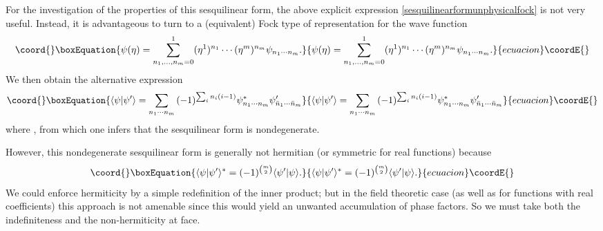 \documentclass[a4paper,10pt]{article}
\begin{document}
For the investigation of the properties of this sesquilinear form, the above explicit 
expression \eqref{sesquilinearformunphysicalfock} is not very useful. Instead, it is 
advantageous to turn to a (equivalent) Fock type of representation for the wave function
\begin{equation}\coord{}\boxEquation{\label{schroedingerwavefunctionrealfermionsfock}
\psi(\eta)=\sum_{n_1,\ldots,n_m=0}^{1}(\eta^1)^{n_1}\cdots
(\eta^m)^{n_m}\psi_{n_1\cdots n_m}.
}{\psi(\eta)=\sum_{n_1,\ldots,n_m=0}^{1}(\eta^1)^{n_1}\cdots
(\eta^m)^{n_m}\psi_{n_1\cdots n_m}.
}{ecuacion}\coordE{}\end{equation}
We then obtain the alternative expression
\begin{equation}\coord{}\boxEquation{\label{innerproductfockrepresentationunphysical}
\langle\psi|\psi^{\prime}\rangle=\sum_{n_1\cdots n_m}\,(-1)^{\sum_{i}n_i(i-1)}
\psi_{n_1\cdots n_m}^{\ast}\psi^{\prime}_{\bar{n}_1\cdots\bar{n}_m}
}{\langle\psi|\psi^{\prime}\rangle=\sum_{n_1\cdots n_m}\,(-1)^{\sum_{i}n_i(i-1)}
\psi_{n_1\cdots n_m}^{\ast}\psi^{\prime}_{\bar{n}_1\cdots\bar{n}_m}
}{ecuacion}\coordE{}\end{equation}
where \coordHE{}, from which one infers that the sesquilinear form is 
nondegenerate.

However, this nondegenerate sesquilinear form is generally not hermitian (or symmetric 
for real functions) because
\begin{equation}\coord{}\boxEquation{
\langle\psi|\psi^{\prime}\rangle^{\ast}=(-1)^{{m \choose 2}}
\langle\psi^{\prime}|\psi\rangle.
}{
\langle\psi|\psi^{\prime}\rangle^{\ast}=(-1)^{{m \choose 2}}
\langle\psi^{\prime}|\psi\rangle.
}{ecuacion}\coordE{}\end{equation}
We could enforce hermiticity by a simple redefinition of the inner product; but in the 
field theoretic case (as well as for functions with real coefficients) this approach is 
not amenable since this would yield an unwanted accumulation of phase factors. So we must 
take both the indefiniteness and the non-hermiticity at face.
\end{document}
